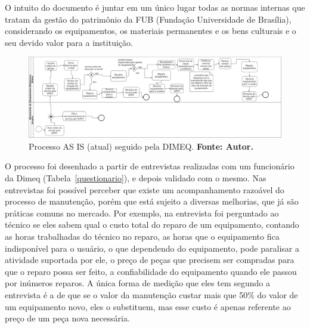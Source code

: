 O intuito do documento é juntar em um único lugar todas as normas internas que tratam da gestão do patrimônio da FUB (Fundação Universidade de Brasília), considerando os equipamentos, os materiais permanentes e os bens culturais e o seu devido valor para a instituição.

\begin{landscape}
\graphicspath{{figuras/}}
\begin{figure}[H]
\centering
\includegraphics[width=1.5\textwidth]{processo_as_is}
\caption{Processo AS IS (atual) seguido pela DIMEQ. \textbf{Fonte: Autor.}}
\label{processo-as-is}
\end{figure}
\end{landscape} 

O processo foi desenhado a partir de entrevistas realizadas com um funcionário da Dimeq (Tabela~\ref{questionario}), e depois validado com o mesmo. Nas entrevistas foi possível perceber que existe um acompanhamento razoável do processo de manutenção, porém que está sujeito a diversas melhorias, que já são práticas comuns no mercado. Por exemplo, na entrevista foi perguntado ao técnico se eles sabem qual o custo total do reparo de um equipamento, contando as horas trabalhadas do técnico no reparo, as horas que o equipamento fica indisponível para o usuário, o que dependendo do equipamento, pode paralisar a atividade suportada por ele, o preço de peças que precisem ser compradas para que o reparo possa ser feito, a confiabilidade do equipamento quando ele passou por inúmeros reparos. A única forma de medição que eles tem segundo a entrevista é a de que se o valor da manutenção custar mais que 50\% do valor de um equipamento novo, eles o substituem, mas esse custo é apenas referente ao preço de um peça nova necessária. 
                                                                

